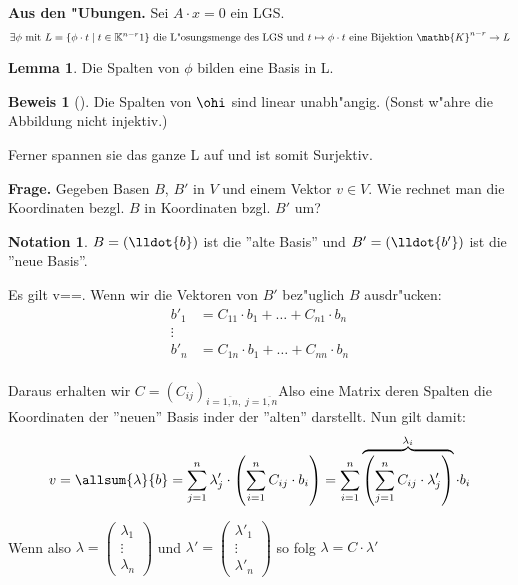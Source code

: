 \documentclass[oneside,fontsize=11pt,paper=a4,BCOR=0mm,DIV=12,automark,headsepline]{scrbook}
\theoremstyle{remark}
\theoremstyle{definition}
\newtheorem*{notation}{Notation}
\newtheorem{lemma}{Lemma}[section]
\theoremstyle{definition}
\newtheorem*{prof}{Beweis}
\theoremstyle{remark}
\begin{document}
\textbf{Aus den "Ubungen.} Sei $A\cdot x = 0$ ein LGS.
\[\exists \phi \text{ mit } L=\{\phi\cdot t\mid t\in
  \mathbb{K}^{n-r}1\} \text{ die L"osungsmenge des LGS und } t \mapsto
  \phi\cdot t \text{ eine Bijektion } \mathb{K}^{n-r}\rightarrow
  L\]

\begin{lemma}
  Die Spalten von \(\phi\) bilden eine Basis in L.
\end{lemma}

\begin{prof}[]
  Die Spalten von \(\ohi\) sind linear unabh"angig. (Sonst w"ahre die Abbildung nicht injektiv.)

  Ferner spannen sie das ganze L auf und ist somit Surjektiv. 
\end{prof}

\textbf{Frage.} Gegeben Basen $B$, $B'$ in \(V\) und einem Vektor \(v\in V\). Wie rechnet man die
Koordinaten bezgl. $B$ in Koordinaten bzgl. $B'$ um?

\begin{notation}
$B=(\lldot{b})$ ist die ''alte Basis'' und $B'=(\lldot{b'})$ ist die ''neue Basis''.
\end{notation}

Es gilt v==. Wenn wir die Vektoren von $B'$ bez"uglich $B$
ausdr"ucken:
\[
  \begin{align*}{}
    b'_1 & = C_{11}\cdot b_1 + \dots + C_{n1}\cdot b_n\\
    \vdots &\\
    b'_n & = C_{1n}\cdot b_1 + \dots + C_{nn}\cdot b_n\\
  \end{align*}
\]

Daraus erhalten wir
$C=(C_{ij})_{i=\overline{1, n},\;j=\overline{1, n}}$\quad Also eine Matrix
deren Spalten die Koordinaten der ''neuen'' Basis inder der ''alten'' darstellt.
Nun gilt damit: \[v=\allsum{\lambda}{b}=\sum_{j=1}^{n}{\lambda'_j\cdot \left({\sum_{i=1}^{n}{C_{ij}\cdot b_i}}\right)}=\sum_{i=1}^n\overbrace{\left({\sum_{j=1}^n{C_{ij}\cdot \lambda'_j}}\right)}^{\lambda_i}\cdot b_i\]

Wenn also $\lambda=\begin{pmatrix}\lambda_1 \\ \vdots \\ \lambda_n\end{pmatrix}$ und $\lambda'=\begin{pmatrix}\lambda'_1 \\ \vdots \\ \lambda'_n\end{pmatrix}$ so folg \(\lambda = C\cdot \lambda'\)
\end{document}
